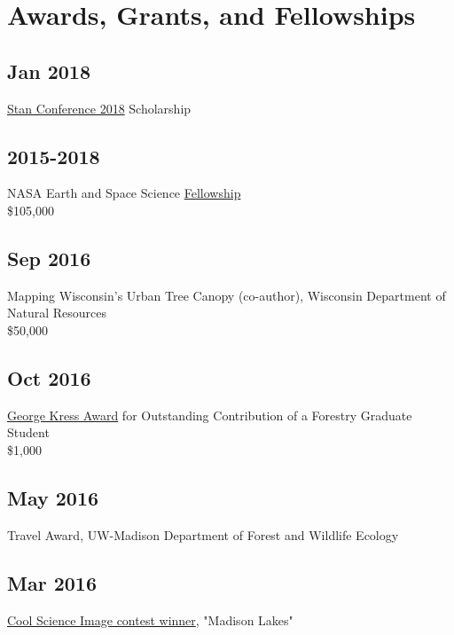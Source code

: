 \documentclass{article}
\begin{document}
\section*{Awards, Grants, and Fellowships}
\label{sec:org6e30026}
\subsection*{Jan 2018}
\label{sec:orgaf80c4d}
\href{http://mc-stan.org/events/}{Stan Conference 2018} Scholarship

\subsection*{2015-2018}
\label{sec:org127b4c6}
NASA Earth and Space Science \href{https://nspires.nasaprs.com/external/viewrepositorydocument/cmdocumentid=459947/solicitationId=\%7BB6CDCEA6-8EDD-A48A-FAF8-E588F66661C3\%7D/viewSolicitationDocument=1/NESSF15\%20selections.pdf}{Fellowship}\\
\$105,000

\subsection*{Sep 2016}
\label{sec:orgc4af4e8}
Mapping Wisconsin's Urban Tree Canopy (co-author), Wisconsin
Department of Natural Resources\\
\$50,000

\subsection*{Oct 2016}
\label{sec:org1f4262f}
\href{https://kb.wisc.edu/russell/page.php?id=65402}{George Kress Award} for Outstanding Contribution of a Forestry Graduate
Student \\
\$1,000

\subsection*{May 2016}
\label{sec:org4f1cb82}
Travel Award, UW-Madison Department of Forest and Wildlife Ecology\\

\subsection*{Mar 2016}
\label{sec:org48a2ae6}
\href{http://news.wisc.edu/cool-science-images-2016/\#\&gid=1\&pid=10}{Cool Science Image contest winner}, "Madison Lakes" \\
\end{document}
